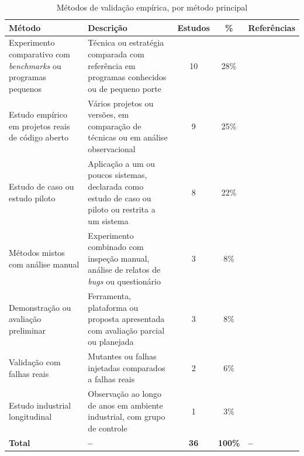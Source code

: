 \begin{table}[H]
    \centering
    \scriptsize
    \caption{Métodos de validação empírica, por método principal}
    \label{tab:validacao-empirica}
    \begin{tabular}{|p{3.0cm}|p{3.8cm}|c|c|p{4.0cm}|}
        \hline
        \textbf{Método} & \textbf{Descrição} & \textbf{Estudos} & \textbf{\%} & \textbf{Referências} \\
        \hline
        Experimento comparativo com \textit{benchmarks} ou programas pequenos & Técnica ou estratégia comparada com referência em programas conhecidos ou de pequeno porte & 10 & 28\% & \cite{shomali2020, arasteh2022, arasteh2023, kurtz2016, zhang2010, kuroishi2020, kintis2010, lin2018, tao2025, nica2011} \\
        \hline
        Estudo empírico em projetos reais de código aberto & Vários projetos ou versões, em comparação de técnicas ou em análise observacional & 9 & 25\% & \cite{zhang2019, zhang2022, ashong2025, ashong2026, guizzo2022, ahmed2016, ojdanic2023, alenezi2016} \\
        \hline
        Estudo de caso ou estudo piloto & Aplicação a um ou poucos sistemas, declarada como estudo de caso ou piloto ou restrita a um sistema & 8 & 22\% & \cite{just2012, jalbert2012, belli2011, esterobotaro2010, assylbekov2013, inozemtseva2013, chauhan2015, he2024} \\
        \hline
        Métodos mistos com análise manual & Experimento combinado com inspeção manual, análise de relatos de \textit{bugs} ou questionário & 3 & 8\% & \cite{yao2014, yandrapally2021, guerino2024} \\
        \hline
        Demonstração ou avaliação preliminar & Ferramenta, plataforma ou proposta apresentada com avaliação parcial ou planejada & 3 & 8\% & \cite{tufano2020, dimov2010, grano2019} \\
        \hline
        Validação com falhas reais & Mutantes ou falhas injetadas comparados a falhas reais & 2 & 6\% & \cite{just2014, khanfir2023} \\
        \hline
        Estudo industrial longitudinal & Observação ao longo de anos em ambiente industrial, com grupo de controle & 1 & 3\% & \cite{petrovic2021} \\
        \hline
        \textbf{Total} & \textbf{--} & \textbf{36} & \textbf{100\%} & \textbf{--} \\
        \hline
    \end{tabular}
\end{table}

